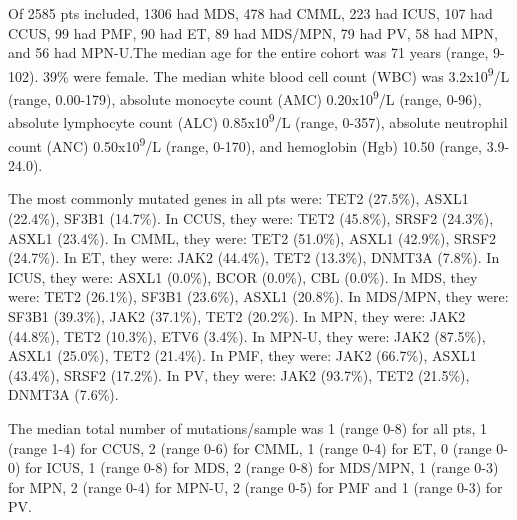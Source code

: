 Of 2585 pts included, 1306 had MDS, 478 had CMML, 223 had ICUS, 107 had CCUS, 99 had PMF, 90 had ET, 89 had MDS/MPN, 79 had PV, 58 had MPN, and 56 had MPN-U.The median age for the entire cohort was 71 years (range, 9-102). 39\% were female. The median white blood cell count (WBC) was 3.2x10\textsuperscript{9}/L (range, 0.00-179), absolute monocyte count (AMC) 0.20x10\textsuperscript{9}/L (range, 0-96), absolute lymphocyte count (ALC) 0.85x10\textsuperscript{9}/L (range, 0-357), absolute neutrophil count (ANC) 0.50x10\textsuperscript{9}/L (range, 0-170), and hemoglobin (Hgb)  10.50 (range, 3.9-24.0). 

The most commonly mutated genes in all pts were: TET2 (27.5\%), ASXL1 (22.4\%), SF3B1 (14.7\%). In CCUS, they were: TET2 (45.8\%), SRSF2 (24.3\%), ASXL1 (23.4\%). In CMML, they were: TET2 (51.0\%), ASXL1 (42.9\%), SRSF2 (24.7\%). In ET, they were: JAK2 (44.4\%), TET2 (13.3\%), DNMT3A (7.8\%). In ICUS, they were: ASXL1 (0.0\%), BCOR (0.0\%), CBL (0.0\%). In MDS, they were: TET2 (26.1\%), SF3B1 (23.6\%), ASXL1 (20.8\%). In MDS/MPN, they were: SF3B1 (39.3\%), JAK2 (37.1\%), TET2 (20.2\%). In MPN, they were: JAK2 (44.8\%), TET2 (10.3\%), ETV6 (3.4\%). In MPN-U, they were: JAK2 (87.5\%), ASXL1 (25.0\%), TET2 (21.4\%). In PMF, they were: JAK2 (66.7\%), ASXL1 (43.4\%), SRSF2 (17.2\%). In PV, they were: JAK2 (93.7\%), TET2 (21.5\%), DNMT3A (7.6\%).

The median total number of mutations/sample was 1 (range 0-8) for all pts, 1 (range 1-4) for CCUS, 2 (range 0-6) for CMML, 1 (range 0-4) for ET, 0 (range 0-0) for ICUS, 1 (range 0-8) for MDS, 2 (range 0-8) for MDS/MPN, 1 (range 0-3) for MPN, 2 (range 0-4) for MPN-U, 2 (range 0-5) for PMF and 1 (range 0-3) for PV.


